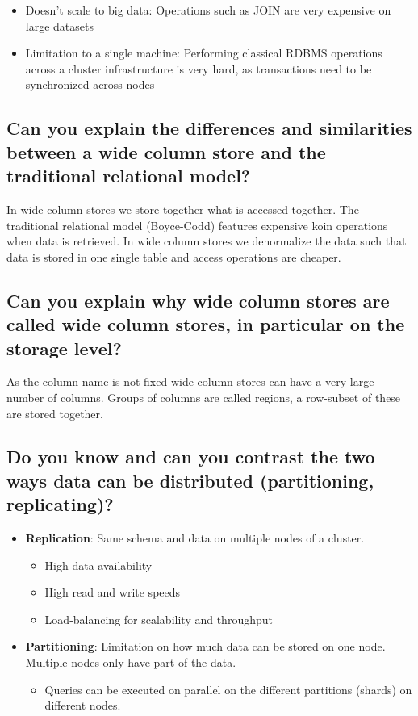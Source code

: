\documentclass{article}
\begin{document}
\begin{itemize}
    \item Doesn't scale to big data: Operations such as JOIN are very expensive on large datasets
    \item Limitation to a single machine: Performing classical RDBMS operations across a cluster infrastructure is very hard, as transactions need to be synchronized across nodes
\end{itemize}

\subsection{Can you explain the differences and similarities between a wide column store and the traditional relational model?}

In wide column stores we store together what is accessed together. The traditional relational model (Boyce-Codd) features expensive koin operations when data is retrieved. In wide column stores we denormalize the data such that data is stored in one single table and access operations are cheaper. 


\subsection{Can you explain why wide column stores are called wide column stores, in particular on the storage level?}

As the column name is not fixed wide column stores can have a very large number of columns. Groups of columns are called regions, a row-subset of these are stored together. 

\subsection{Do you know and can you contrast the two ways data can be distributed (partitioning, replicating)?}

\begin{itemize}
    \item \textbf{Replication}: Same schema and data on multiple nodes of a cluster. 
    \begin{itemize}
        \item High data availability
        \item High read and write speeds
        \item Load-balancing for scalability and throughput
    \end{itemize}
    \item \textbf{Partitioning}: Limitation on how much data can be stored on one node. Multiple nodes only have part of the data. 
    \begin{itemize}
        \item Queries can be executed on parallel on the different partitions (shards) on different nodes. 
    \end{itemize}
\end{itemize}
\end{document}
